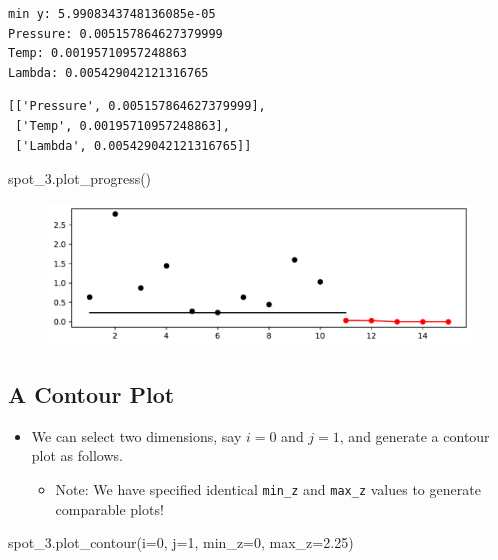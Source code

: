 \documentclass[
  letterpaper,
  DIV=11,
  numbers=noendperiod]{scrreprt}
\newenvironment{Shaded}{\begin{snugshade}}{\end{snugshade}}
\newcommand{\DecValTok}[1]{\textcolor[rgb]{0.68,0.00,0.00}{#1}}
\newcommand{\FloatTok}[1]{\textcolor[rgb]{0.68,0.00,0.00}{#1}}
\newcommand{\NormalTok}[1]{\textcolor[rgb]{0.00,0.23,0.31}{#1}}
\newcommand{\OperatorTok}[1]{\textcolor[rgb]{0.37,0.37,0.37}{#1}}
\providecommand{\tightlist}{%
  \setlength{\itemsep}{0pt}\setlength{\parskip}{0pt}}\usepackage{longtable,booktabs,array}
\begin{document}
\begin{verbatim}
min y: 5.9908343748136085e-05
Pressure: 0.005157864627379999
Temp: 0.00195710957248863
Lambda: 0.005429042121316765
\end{verbatim}

\begin{verbatim}
[['Pressure', 0.005157864627379999],
 ['Temp', 0.00195710957248863],
 ['Lambda', 0.005429042121316765]]
\end{verbatim}

\begin{Shaded}
\begin{Highlighting}[]
\NormalTok{spot\_3.plot\_progress()}
\end{Highlighting}
\end{Shaded}

\begin{figure}[H]

{\centering \includegraphics{008_num_spot_multidim_files/figure-pdf/cell-7-output-1.pdf}

}

\end{figure}

\hypertarget{a-contour-plot}{%
\subsection{A Contour Plot}\label{a-contour-plot}}

\begin{itemize}
\tightlist
\item
  We can select two dimensions, say \(i=0\) and \(j=1\), and generate a
  contour plot as follows.

  \begin{itemize}
  \tightlist
  \item
    Note: We have specified identical \texttt{min\_z} and
    \texttt{max\_z} values to generate comparable plots!
  \end{itemize}
\end{itemize}

\begin{Shaded}
\begin{Highlighting}[]
\NormalTok{spot\_3.plot\_contour(i}\OperatorTok{=}\DecValTok{0}\NormalTok{, j}\OperatorTok{=}\DecValTok{1}\NormalTok{, min\_z}\OperatorTok{=}\DecValTok{0}\NormalTok{, max\_z}\OperatorTok{=}\FloatTok{2.25}\NormalTok{)}
\end{Highlighting}
\end{Shaded}
\end{document}
